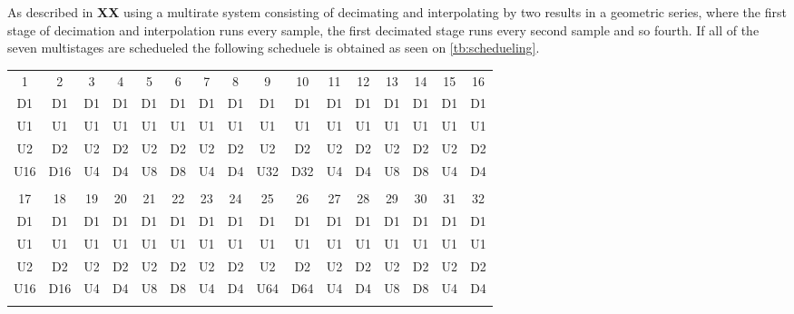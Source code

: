 As described in \textbf{XX} using a multirate system consisting of decimating and interpolating by two results in a geometric series, where the first stage of decimation and interpolation runs every sample, the first decimated stage runs every second sample and so fourth. If all of the seven multistages are schedueled the following scheduele is obtained as seen on \autoref{tb:schedueling}.    



\begin{table}[H]
\centering
\begin{tabular}{|c|c|c|c|c|c|c|c|c|c|c|c|c|c|c|c|}
\hline
\rowcolor[HTML]{C0C0C0} 
\multicolumn{16}{|c|}{\cellcolor[HTML]{C0C0C0}Sample}                             \\ \hline
\rowcolor[HTML]{C0C0C0} 
1   & 2   & 3  & 4  & 5  & 6  & 7  & 8  & 9   & 10  & 11 & 12 & 13 & 14 & 15 & 16 \\ \hline
D1  & D1  & D1 & D1 & D1 & D1 & D1 & D1 & D1  & D1  & D1 & D1 & D1 & D1 & D1 & D1 \\ \hline
U1  & U1  & U1 & U1 & U1 & U1 & U1 & U1 & U1  & U1  & U1 & U1 & U1 & U1 & U1 & U1 \\ \hline
U2  & D2  & U2 & D2 & U2 & D2 & U2 & D2 & U2  & D2  & U2 & D2 & U2 & D2 & U2 & D2 \\ \hline
U16 & D16 & U4 & D4 & U8 & D8 & U4 & D4 & U32 & D32 & U4 & D4 & U8 & D8 & U4 & D4 \\ \hline
\rowcolor[HTML]{C0C0C0} 
\multicolumn{16}{|c|}{\cellcolor[HTML]{C0C0C0}Sample}                             \\ \hline
\rowcolor[HTML]{C0C0C0} 
17  & 18  & 19 & 20 & 21 & 22 & 23 & 24 & 25  & 26  & 27 & 28 & 29 & 30 & 31 & 32 \\ \hline
D1  & D1  & D1 & D1 & D1 & D1 & D1 & D1 & D1  & D1  & D1 & D1 & D1 & D1 & D1 & D1 \\ \hline
U1  & U1  & U1 & U1 & U1 & U1 & U1 & U1 & U1  & U1  & U1 & U1 & U1 & U1 & U1 & U1 \\ \hline
U2  & D2  & U2 & D2 & U2 & D2 & U2 & D2 & U2  & D2  & U2 & D2 & U2 & D2 & U2 & D2 \\ \hline
U16 & D16 & U4 & D4 & U8 & D8 & U4 & D4 & U64 & D64 & U4 & D4 & U8 & D8 & U4 & D4 \\ \hline
\rowcolor[HTML]{C0C0C0} 
\multicolumn{16}{|c|}{\cellcolor[HTML]{C0C0C0}Sample}                             \\ \hline

\end{tabular}
\end{table}
